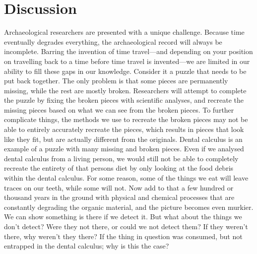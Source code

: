 \documentclass[
  letterpaper,
]{book}
\begin{document}
\hypertarget{chap-discussion}{%
\chapter{Discussion}\label{chap-discussion}}

Archaeological researchers are presented with a unique challenge.
Because time eventually degrades everything, the archaeological record
will always be incomplete. Barring the invention of time travel---and
depending on your position on travelling back to a time before time
travel is invented---we are limited in our ability to fill these gaps in
our knowledge. Consider it a puzzle that needs to be put back together.
The only problem is that some pieces are permanently missing, while the
rest are mostly broken. Researchers will attempt to complete the puzzle
by fixing the broken pieces with scientific analyses, and recreate the
missing pieces based on what we can see from the broken pieces. To
further complicate things, the methods we use to recreate the broken
pieces may not be able to entirely accurately recreate the pieces, which
results in pieces that look like they fit, but are actually different
from the originals. Dental calculus is an example of a puzzle with many
missing and broken pieces. Even if we analysed dental calculus from a
living person, we would still not be able to completely recreate the
entirety of that persons diet by only looking at the food debris within
the dental calculus. For some reason, some of the things we eat will
leave traces on our teeth, while some will not. Now add to that a few
hundred or thousand years in the ground with physical and chemical
processes that are constantly degrading the organic material, and the
picture becomes even murkier. We can show something is there if we
detect it. But what about the things we don't detect? Were they not
there, or could we not detect them? If they weren't there, why weren't
they there? If the thing in question was consumed, but not entrapped in
the dental calculus; why is this the case?
\end{document}
